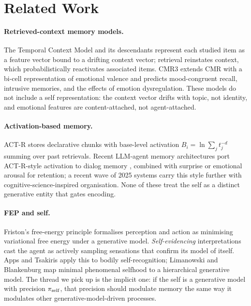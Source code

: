 \section{Related Work}
\label{sec:related}

\paragraph{Retrieved-context memory models.}
The Temporal Context Model \cite{howard2002tcm} and its descendants
\cite{polyn2009cmr,cohen2022cmr3} represent each studied item as a feature
vector bound to a drifting context vector; retrieval reinstates context,
which probabilistically reactivates associated items. CMR3
\cite{cohen2022cmr3} extends CMR with a bi-cell representation of
emotional valence and predicts mood-congruent recall, intrusive
memories, and the effects of emotion dysregulation. These models do not
include a self representation: the context vector drifts with topic, not
identity, and emotional features are content-attached, not agent-attached.

\paragraph{Activation-based memory.}
ACT-R \cite{anderson2007actr} stores declarative chunks with
base-level activation $B_i = \ln \sum_j t_j^{-d}$ summing over past
retrievals. Recent LLM-agent memory architectures port ACT-R-style
activation to dialog memory \cite{memos2025},
combined with surprise or emotional arousal for retention; a recent wave
of 2025 systems carry this style further with cognitive-science-inspired
organisation. None of these treat the self as a distinct generative
entity that gates encoding.

\paragraph{FEP and self.}
Friston's free-energy principle \cite{friston2010fep,friston2017ai}
formalises perception and action as minimising variational free energy
under a generative model. \textit{Self-evidencing} interpretations
\cite{hohwy2016selfevidencing,seth2018beast} cast the agent as actively
sampling sensations that confirm its model of itself. Apps and Tsakiris
\cite{apps2014freeself} apply this to bodily self-recognition; Limanowski
and Blankenburg \cite{limanowski2013minimalself} map minimal phenomenal
selfhood to a hierarchical generative model. The thread we pick up is
the implicit one: if the self is a generative model with precision
$\pi_{\text{self}}$, that precision should modulate memory the same way it
modulates other generative-model-driven processes.


